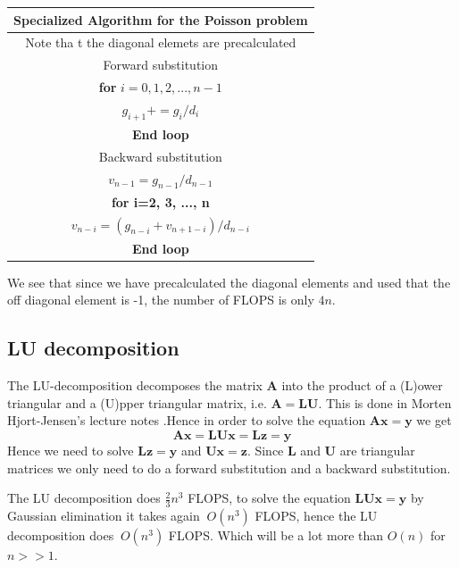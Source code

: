 \documentclass[10pt]{article}
\begin{document}
\begin{center}
  \begin{tabular}{||c||}
    \hline\hline
    \textbf{Specialized Algorithm for the Poisson problem}\\
    \hline\hline Note tha
    t the diagonal elemets are precalculated\\
    Forward substitution \\
    \textbf{for} $i=0,1,2,...,n-1$\\
      $g_{i+1}+=g_i/d_i$\\
      \textbf{End loop} \\
      Backward substitution \\
      $v_{n-1}=g_{n-1}/d_{n-1}$\\
      \textbf{for i=2, 3, ..., n} \\
      $v_{n-i}=(g_{n-i}+v_{n+1-i})/d_{n-i}$\\ 
      \textbf{End loop}\\
      \hline\hline
  \end{tabular}
\end{center}
 We see that since we have precalculated the diagonal elements and used that the off diagonal element is -1, the number of FLOPS is only $4n$.

\subsection{LU decomposition}
The LU-decomposition decomposes the matrix $\mathbf{A}$ into the product of a (L)ower triangular and a (U)pper triangular matrix, i.e. $\mathbf{A}=\mathbf{L}\mathbf{U}$. This is done in Morten Hjort-Jensen's lecture notes \cite{morten}.Hence in order to solve the equation $\mathbf{A}\mathbf{x}=\mathbf{y}$ we get $$\mathbf{A}\mathbf{x}=\mathbf{L}\mathbf{U}\mathbf{x}=\mathbf{L}\mathbf{z}=\mathbf{y} $$
Hence we need to solve $\mathbf{L}\mathbf{z}=\mathbf{y}$ and $\mathbf{U}\mathbf{x}=\mathbf{z}$. Since $\mathbf{L}$ and $\mathbf{U}$ are triangular matrices we only need to do a forward substitution and a backward substitution. 

The LU decomposition does $\frac{2}{3}n^3$ FLOPS, to solve the equation $\mathbf{L}\mathbf{U}\mathbf{x}=\mathbf{y}$ by Gaussian elimination it takes again $~O(n^3)$ FLOPS, hence the LU decomposition does $~O(n^3)$ FLOPS. Which will be a lot more than $O(n)$ for $n>>1$.
\end{document}
